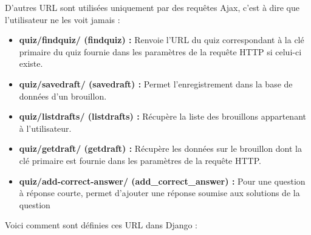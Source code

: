 \documentclass[a4paper,11pt,openany,oneside]{sphinxmanual}
\begin{document}
D'autres URL sont utilisées uniquement par des requêtes Ajax, c'est à dire que l'utilisateur ne les voit jamais :
\begin{itemize}
\item {} 
\textbf{quiz/findquiz/ (findquiz) :} Renvoie l'URL du quiz correspondant à la clé primaire du quiz fournie dans les paramètres de la requête HTTP si celui-ci existe.

\item {} 
\textbf{quiz/savedraft/ (savedraft) :} Permet l'enregistrement dans la base de données d'un brouillon.

\item {} 
\textbf{quiz/listdrafts/ (listdrafts) :} Récupère la liste des brouillons appartenant à l'utilisateur.

\item {} 
\textbf{quiz/getdraft/ (getdraft) :} Récupère les données sur le brouillon dont la clé primaire est fournie dans les paramètres de la requête HTTP.

\item {} 
\textbf{quiz/add-correct-answer/ (add\_correct\_answer) :} Pour une question à réponse courte, permet d'ajouter une réponse soumise aux solutions de la question

\end{itemize}

Voici comment sont définies ces URL dans Django :
\end{document}
